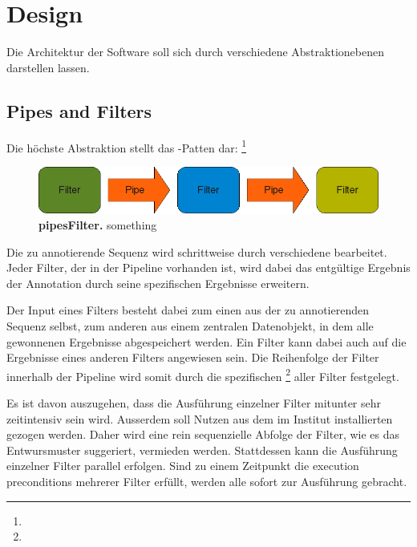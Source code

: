 \section{Design}
Die Architektur der Software soll sich durch verschiedene Abstraktionebenen
darstellen lassen. 

\subsection{Pipes and Filters}
Die höchste Abstraktion stellt das -Patten dar:
\footnote{}

\begin{figure}[htbp]
	\begin{center}
		\includegraphics[scale=0.7]{pics/pipesFilter3.png}
	\caption[Pipes and Filter]{
	\textbf{pipesFilter.}
	something}
	\end{center}
	\label{fig:pipesFilter}
\end{figure}

Die zu annotierende Sequenz wird schrittweise durch verschiedene 
bearbeitet. Jeder Filter, der in der Pipeline vorhanden ist, wird dabei das
entgültige Ergebnis der Annotation durch seine spezifischen Ergebnisse
erweitern.

Der Input eines Filters besteht dabei zum einen aus der zu
annotierenden Sequenz selbst, zum anderen aus einem zentralen Datenobjekt, in
dem alle gewonnenen Ergebnisse abgespeichert werden.
Ein Filter kann dabei auch auf die Ergebnisse eines anderen
Filters angewiesen sein. Die Reihenfolge der Filter innerhalb der Pipeline wird
somit durch die spezifischen 
\footnote{} aller Filter festgelegt.

Es ist davon auszugehen, dass die Ausführung einzelner Filter mitunter sehr
zeitintensiv sein wird. Ausserdem soll Nutzen aus dem im Institut installierten
 gezogen werden. Daher wird eine rein sequenzielle Abfolge der
Filter, wie es das Entwursmuster suggeriert, vermieden werden.
Stattdessen kann die Ausführung einzelner Filter parallel erfolgen.
Sind zu einem Zeitpunkt die execution preconditions mehrerer Filter erfüllt,
werden alle sofort zur Ausführung gebracht.

